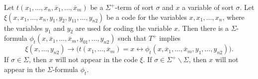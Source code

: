 \begin{lemma} Let
  $t(x_1,\ldots, x_n, \overline{x}_1,\ldots, \overline{x}_m)$ be a
  $\Sigma^+$-term of sort $\sigma$ and $x$ a variable of sort
  $\sigma$. Let
  $\xi(x,x_1,\ldots, x_n,y_1,y_2,y_{11}, \ldots, y_{n2})$ be a code
  for the variables $x,x_1,\ldots, x_n$, where the variables $y_1$ and
  $y_2$ are used for coding the variable $x$.  Then there is a
  $\Sigma$-formula
  $\phi_t(x,\overline{x}_1,\ldots, \overline{x}_m, y_{01}, \ldots,
  y_{n2})$ such that $T^+$ implies 
  \[ \xi(x,\ldots, y_{n2})\rightarrow \big(t(x_1, \ldots,
    \overline{x}_m)=x\leftrightarrow\phi_t(x,
    \overline{x}_1,\ldots,\overline{x}_m, y_1,\ldots, y_{n2})\big)
    . \] If $\sigma\in\Sigma$, then $x$ will not appear in the code
  $\xi$. If $\sigma\in\Sigma^+\backslash\Sigma$, then $x$ will not
  appear in the $\Sigma$-formula $\phi_t$. \label{thomas} \end{lemma}

